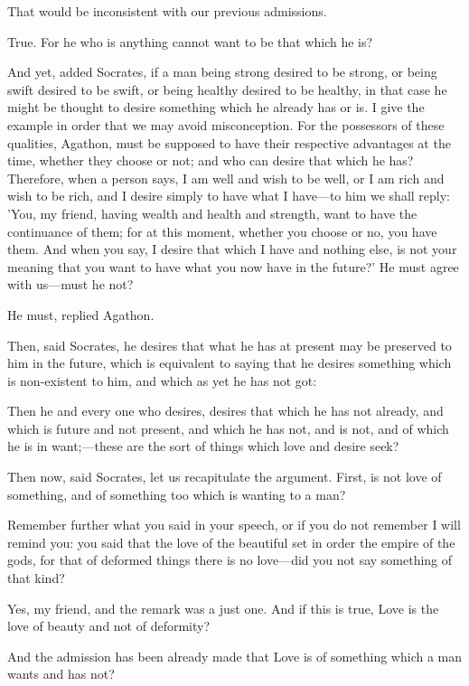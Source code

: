 \para[96] That would be inconsistent with our previous admissions.

\para[97] True. For he who is anything cannot want to be that which he is?

\para[98] And yet, added Socrates, if a man being strong desired to be strong, or being swift desired to be swift, or being healthy desired to be healthy, in that case he might be thought to desire something which he already has or is. I give the example in order that we may avoid misconception. For the possessors of these qualities, Agathon, must be supposed to have their respective advantages at the time, whether they choose or not; and who can desire that which he has? Therefore, when a person says, I am well and wish to be well, or I am rich and wish to be rich, and I desire simply to have what I have---to him we shall reply: 'You, my friend, having wealth and health and strength, want to have the continuance of them; for at this moment, whether you choose or no, you have them. And when you say, I desire that which I have and nothing else, is not your meaning that you want to have what you now have in the future?' He must agree with us---must he not?

\para[99] He must, replied Agathon.

\para[100] Then, said Socrates, he desires that what he has at present may be preserved to him in the future, which is equivalent to saying that he desires something which is non-existent to him, and which as yet he has not got:

\para[101] Then he and every one who desires, desires that which he has not already, and which is future and not present, and which he has not, and is not, and of which he is in want;---these are the sort of things which love and desire seek?

\para[102] Then now, said Socrates, let us recapitulate the argument. First, is not love of something, and of something too which is wanting to a man?

\para[103] Remember further what you said in your speech, or if you do not remember I will remind you: you said that the love of the beautiful set in order the empire of the gods, for that of deformed things there is no love---did you not say something of that kind?

\para[104] Yes, my friend, and the remark was a just one. And if this is true, Love is the love of beauty and not of deformity?

\para[105] And the admission has been already made that Love is of something which a man wants and has not?

